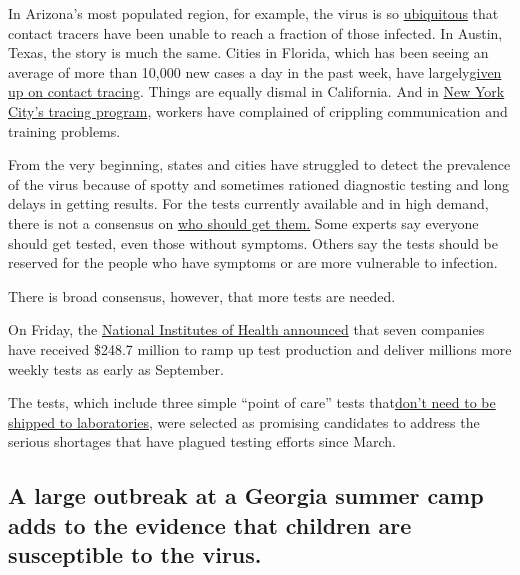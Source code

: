 In Arizona's most populated region, for example, the virus is so
\href{https://www.azfamily.com/news/continuing_coverage/coronavirus_coverage/contact-tracing-important-but-less-useful-with-spiking-cases-maricopa-county-says/article_57d55328-bb4b-11ea-8718-8b1cf4ab4137.html}{ubiquitous}
that contact tracers have been unable to reach a fraction of those
infected. In Austin, Texas, the story is much the same. Cities in
Florida, which has been seeing an average of more than 10,000 new cases
a day in the past week, have
largely\href{https://www.nbcmiami.com/news/local/miami-beach-mayor-urges-desantis-to-address-failures-of-floridas-contact-tracing-program/2268324/}{given
up on contact tracing}. Things are equally dismal in California. And in
\href{https://www.nytimes3xbfgragh.onion/2020/07/29/nyregion/new-york-contact-tracing.html}{New
York City's tracing program}, workers have complained of crippling
communication and training problems.

From the very beginning, states and cities have struggled to detect the
prevalence of the virus because of spotty and sometimes rationed
diagnostic testing and long delays in getting results. For the tests
currently available and in high demand, there is not a consensus on
\href{https://www.nytimes3xbfgragh.onion/2020/07/31/health/coronavirus-test-ethics.html}{who
should get them.} Some experts say everyone should get tested, even
those without symptoms. Others say the tests should be reserved for the
people who have symptoms or are more vulnerable to infection.

There is broad consensus, however, that more tests are needed.

On Friday, the
\href{https://www.nih.gov/news-events/news-releases/nih-delivering-new-covid-19-testing-technologies-meet-us-demand}{National
Institutes of Health announced} that seven companies have received
\$248.7 million to ramp up test production and deliver millions more
weekly tests as early as September.

The tests, which include three simple ``point of care'' tests
that\href{https://www.nytimes3xbfgragh.onion/2020/07/06/health/fast-coronavirus-tests.html}{don't
need to be shipped to laboratories}, were selected as promising
candidates to address the serious shortages that have plagued testing
efforts since March.

\hypertarget{a-large-outbreak-at-a-georgia-summer-camp-adds-to-the-evidence-that-children-are-susceptible-to-the-virus}{%
\subsection{A large outbreak at a Georgia summer camp adds to the
evidence that children are susceptible to the
virus.}\label{a-large-outbreak-at-a-georgia-summer-camp-adds-to-the-evidence-that-children-are-susceptible-to-the-virus}}


